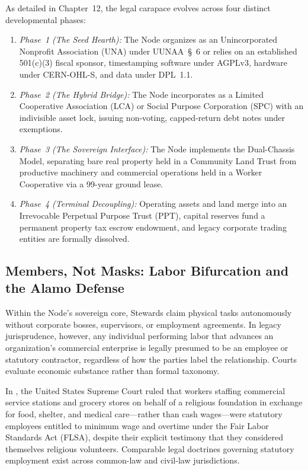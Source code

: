 As detailed in Chapter~12, the legal carapace evolves across four distinct developmental phases:
\begin{enumerate}
  \item \textit{Phase~1 (The Seed Hearth):} The Node organizes as an Unincorporated Nonprofit Association (UNA) under UUNAA~\S~6 or relies on an established 501(c)(3) fiscal sponsor, timestamping software under AGPLv3, hardware under CERN-OHL-S, and data under DPL~1.1.
  \item \textit{Phase~2 (The Hybrid Bridge):} The Node incorporates as a Limited Cooperative Association (LCA) or Social Purpose Corporation (SPC) with an indivisible asset lock, issuing non-voting, capped-return debt notes under \textcite{reves1990} exemptions.
  \item \textit{Phase~3 (The Sovereign Interface):} The Node implements the Dual-Chassis Model, separating bare real property held in a Community Land Trust from productive machinery and commercial operations held in a Worker Cooperative via a 99-year ground lease.
  \item \textit{Phase~4 (Terminal Decoupling):} Operating assets and land merge into an Irrevocable Perpetual Purpose Trust (PPT), capital reserves fund a permanent property tax escrow endowment, and legacy corporate trading entities are formally dissolved.
\end{enumerate}

\subsection{Members, Not Masks: Labor Bifurcation and the Alamo Defense}

Within the Node's sovereign core, Stewards claim physical tasks autonomously without corporate bosses, supervisors, or employment agreements. In legacy jurisprudence, however, any individual performing labor that advances an organization's commercial enterprise is legally presumed to be an employee or statutory contractor, regardless of how the parties label the relationship. Courts evaluate economic substance rather than formal taxonomy.

In \textcite{alamo1985}, the United States Supreme Court ruled that workers staffing commercial service stations and grocery stores on behalf of a religious foundation in exchange for food, shelter, and medical care—rather than cash wages—were statutory employees entitled to minimum wage and overtime under the Fair Labor Standards Act (FLSA), despite their explicit testimony that they considered themselves religious volunteers. Comparable legal doctrines governing statutory employment exist across common-law and civil-law jurisdictions.

